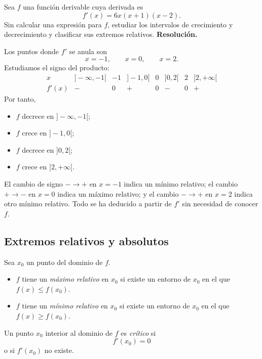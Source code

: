 \begin{solvedexercise}
Sea $f$ una función derivable cuya derivada es
\[
f'(x)=6x(x+1)(x-2).
\]
Sin calcular una expresión para $f$, estudiar los intervalos de crecimiento y decrecimiento y clasificar sus extremos relativos.
\tcblower
\textbf{Resolución.}\par\smallskip
Los puntos donde $f'$ se anula son
\[
x=-1,\qquad x=0,\qquad x=2.
\]
Estudiamos el signo del producto:
\[
\begin{array}{c|ccccccc}
x & ]-\infty,-1[ & -1 & ]-1,0[ & 0 & ]0,2[ & 2 & ]2,+\infty[\\
\hline
f'(x) & - & 0 & + & 0 & - & 0 & +
\end{array}
\]
Por tanto,
\begin{itemize}
\item $f$ decrece en $]-\infty,-1[$;
\item $f$ crece en $]-1,0[$;
\item $f$ decrece en $]0,2[$;
\item $f$ crece en $]2,+\infty[$.
\end{itemize}
El cambio de signo $-\to+$ en $x=-1$ indica un mínimo relativo; el cambio $+\to-$ en $x=0$ indica un máximo relativo; y el cambio $-\to+$ en $x=2$ indica otro mínimo relativo. Todo se ha deducido a partir de $f'$ sin necesidad de conocer $f$.
\end{solvedexercise}

\subsection{Extremos relativos y absolutos}

\begin{definition}
Sea $x_0$ un punto del dominio de $f$.
\begin{itemize}
\item $f$ tiene un \emph{máximo relativo} en $x_0$ si existe un entorno de $x_0$ en el que $f(x)\leq f(x_0)$.
\item $f$ tiene un \emph{mínimo relativo} en $x_0$ si existe un entorno de $x_0$ en el que $f(x)\geq f(x_0)$.
\end{itemize}
\end{definition}

\begin{definition}
Un punto $x_0$ interior al dominio de $f$ es \emph{crítico} si
\[
f'(x_0)=0
\]
o si $f'(x_0)$ no existe.
\end{definition}

